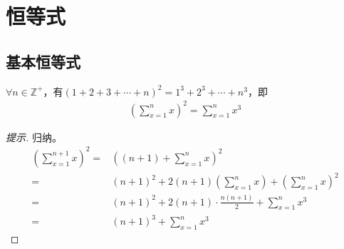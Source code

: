 
\chapter{恒等式}
\label{chap:identities}

\section{基本恒等式}
\label{sec:basic-identities}

\begin{example}
  $\forall n\in\mathbb{Z^+}$，有$(1+2+3+\cdots+n)^2 = 1^3 + 2^3 + \cdots + n^3$，即
  \begin{align*}
    \left(\sum_{x=1}^n x \right)^2 = \sum_{x=1}^n x^3
  \end{align*}
\end{example}
\begin{proof}[提示]归纳。
  \begin{align*}
    \left(\sum_{x=1}^{n+1} x \right)^2 ={}& \left((n+1) + \sum_{x=1}^{n} x \right)^2 \\
    ={}& (n+1)^2 + 2(n+1)\left(\sum_{x=1}^{n} x \right) + \left(\sum_{x=1}^{n} x \right)^2\\
    ={}& (n+1)^2 + 2(n+1)\cdot\frac{n(n+1)}{2} + \sum_{x=1}^n x^3\\
    ={}& (n+1)^3 + \sum_{x=1}^n x^3
  \end{align*}
\end{proof}


